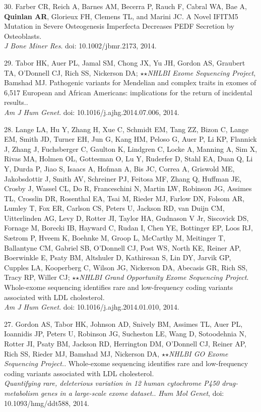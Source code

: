 \documentclass[margin,line]{cv}
\begin{document}
\begin{resume}
\begin{list}{*}{}
    \item[30.] Farber CR, Reich A, Barnes AM, Becerra P, Rauch F, Cabral WA, Bae A, \textbf{Quinlan AR}, Glorieux FH, Clemens TL, and Marini JC.
    A Novel IFITM5 Mutation in Severe Osteogenesis Imperfecta Decreases PEDF Secretion by Osteoblasts.\\
    \emph{J Bone Miner Res}. doi: 10.1002/jbmr.2173, 2014.

    \item[29.] Tabor HK, Auer PL, Jamal SM, Chong JX, Yu JH, Gordon AS, Graubert TA, O'Donnell CJ, Rich SS, Nickerson DA; $\star$$\star$\textit{NHLBI Exome Sequencing Project}, Bamshad MJ.
    Pathogenic variants for Mendelian and complex traits in exomes of 6,517 European and African Americans: implications for the return of incidental results..\\
    \emph{Am J Hum Genet}. doi: 10.1016/j.ajhg.2014.07.006, 2014.

    \item[28.] Lange LA, Hu Y, Zhang H, Xue C, Schmidt EM, Tang ZZ, Bizon C, Lange EM, Smith JD, Turner EH, Jun G, Kang HM, Peloso G, Auer P, Li KP, Flannick J, Zhang J, Fuchsberger C, Gaulton K, Lindgren C, Locke A, Manning A, Sim X, Rivas MA, Holmen OL, Gottesman O, Lu Y, Ruderfer D, Stahl EA, Duan Q, Li Y, Durda P, Jiao S, Isaacs A, Hofman A, Bis JC, Correa A, Griswold ME, Jakobsdottir J, Smith AV, Schreiner PJ, Feitosa MF, Zhang Q, Huffman JE, Crosby J, Wassel CL, Do R, Franceschini N, Martin LW, Robinson JG, Assimes TL, Crosslin DR, Rosenthal EA, Tsai M, Rieder MJ, Farlow DN, Folsom AR, Lumley T, Fox ER, Carlson CS, Peters U, Jackson RD, van Duijn CM, Uitterlinden AG, Levy D, Rotter JI, Taylor HA, Gudnason V Jr, Siscovick DS, Fornage M, Borecki IB, Hayward C, Rudan I, Chen YE, Bottinger EP, Loos RJ, Sætrom P, Hveem K, Boehnke M, Groop L, McCarthy M, Meitinger T, Ballantyne CM, Gabriel SB, O'Donnell CJ, Post WS, North KE, Reiner AP, Boerwinkle E, Psaty BM, Altshuler D, Kathiresan S, Lin DY, Jarvik GP, Cupples LA, Kooperberg C, Wilson JG, Nickerson DA, Abecasis GR, Rich SS, Tracy RP, Willer CJ; $\star$$\star$\textit{NHLBI Grand Opportunity Exome Sequencing Project}.
    Whole-exome sequencing identifies rare and low-frequency coding variants associated with LDL cholesterol.\\
    \emph{Am J Hum Genet}. doi: 10.1016/j.ajhg.2014.01.010, 2014.

    \item[27.] Gordon AS, Tabor HK, Johnson AD, Snively BM, Assimes TL, Auer PL, Ioannidis JP, Peters U, Robinson JG, Sucheston LE, Wang D, Sotoodehnia N, Rotter JI, Psaty BM, Jackson RD, Herrington DM, O'Donnell CJ, Reiner AP, Rich SS, Rieder MJ, Bamshad MJ, Nickerson DA, $\star$$\star$\textit{NHLBI GO Exome Sequencing Project.}.
    Whole-exome sequencing identifies rare and low-frequency coding variants associated with LDL cholesterol.\\
    \emph{Quantifying rare, deleterious variation in 12 human cytochrome P450 drug-metabolism genes in a large-scale exome dataset.}. \emph{Hum Mol Genet}, doi: 10.1093/hmg/ddt588, 2014.


\end{list}
\end{resume}
\end{document}
